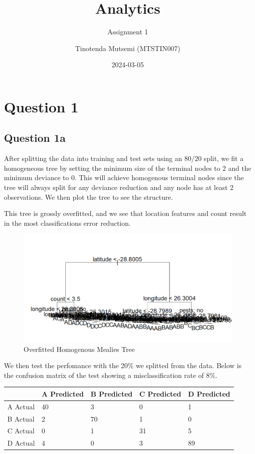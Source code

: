 \documentclass[
]{article}
\title{Analytics}
\subtitle{Assignment 1}
\author{Tinotenda Mutsemi (MTSTIN007)}
\date{2024-03-05}
\begin{document}
\maketitle

\hypertarget{question-1}{%
\section{Question 1}\label{question-1}}

\hypertarget{question-1a}{%
\subsection{Question 1a}\label{question-1a}}

After splitting the data into training and test sets using an 80/20
split, we fit a homogeneous tree by setting the minimum size of the
terminal nodes to 2 and the minimum deviance to 0. This will achieve
homogenous terminal nodes since the tree will always split for any
deviance reduction and any node has at least 2 observations. We then
plot the tree to see the structure.

This tree is grossly overfitted, and we see that location features and
count result in the most classifications error reduction.

\begin{figure}
\centering
\includegraphics[width=4.51042in,height=\textheight]{big_tree_mealies.png}
\caption{Overfitted Homogenous Mealies Tree}
\end{figure}

We then test the perfomance with the 20\% we splitted from the data.
Below is the confusion matrix of the test showing a misclassification
rate of 8\%.

\begin{longtable}[]{@{}lllll@{}}
\toprule\noalign{}
& A Predicted & B Predicted & C Predicted & D Predicted \\
\midrule\noalign{}
\endhead
\bottomrule\noalign{}
\endlastfoot
A Actual & 40 & 3 & 0 & 1 \\
B Actual & 2 & 70 & 1 & 0 \\
C Actual & 0 & 1 & 31 & 5 \\
D Actual & 4 & 0 & 3 & 89 \\
\end{longtable}
\end{document}
